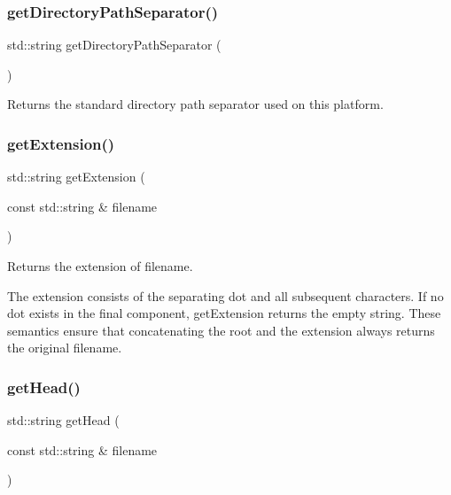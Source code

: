 \subsubsection{\texorpdfstring{get\+Directory\+Path\+Separator()}{getDirectoryPathSeparator()}}
{\footnotesize\ttfamily std\+::string get\+Directory\+Path\+Separator (\begin{DoxyParamCaption}{ }\end{DoxyParamCaption})}



Returns the standard directory path separator used on this platform. 

\mbox{\label{namespacesgl_1_1priv_1_1filelib_ab0ca25cac63d69dc0a0cd4d4f4e6ceb7}} 
\subsubsection{\texorpdfstring{get\+Extension()}{getExtension()}}
{\footnotesize\ttfamily std\+::string get\+Extension (\begin{DoxyParamCaption}\item[{const std\+::string \&}]{filename }\end{DoxyParamCaption})}



Returns the extension of {\ttfamily filename}. 

The extension consists of the separating dot and all subsequent characters. If no dot exists in the final component, {\ttfamily get\+Extension} returns the empty string. These semantics ensure that concatenating the root and the extension always returns the original filename. \mbox{\label{namespacesgl_1_1priv_1_1filelib_a2c275b431da9932dc59b4995cb8a832f}} 
\subsubsection{\texorpdfstring{get\+Head()}{getHead()}}
{\footnotesize\ttfamily std\+::string get\+Head (\begin{DoxyParamCaption}\item[{const std\+::string \&}]{filename }\end{DoxyParamCaption})}



